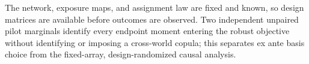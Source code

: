 The network, exposure maps, and assignment law are fixed and known, so design matrices are available before outcomes are observed.  Two independent unpaired pilot marginals identify every endpoint moment entering the robust objective without identifying or imposing a cross-world copula; this separates ex ante basis choice from the fixed-array, design-randomized causal analysis.